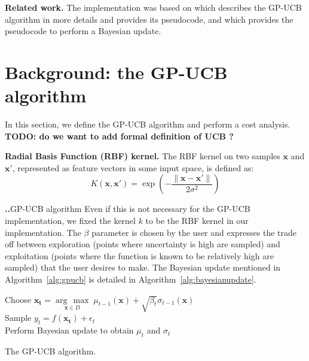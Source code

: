 \documentclass[letterpaper]{article}
\newcommand{\argmax}[1]{\underset{#1}{\operatorname{arg}\,\operatorname{max}}\;}
\newcommand{\mypar}[1]{{\bf #1.}}
\begin{document}
\mypar{Related work} The implementation was based on \cite{Krause:09} which describes the GP-UCB algorithm in more details and provides its pseudocode, and \cite{rasmussen2006gaussian} which provides the pseudocode to perform a Bayesian update.

\section{Background: the GP-UCB algorithm}\label{sec:background}

In this section, we define the GP-UCB algorithm and perform a cost analysis. \textbf{TODO: do we want to add formal definition of UCB ?}

\mypar{Radial Basis Function (RBF) kernel}
The RBF kernel on two samples $\mathbf{x}$ and $\mathbf{x'}$, represented as feature vectors in some input space, is defined as:
\begin{equation*}
    K(\mathbf{x}, \mathbf{x'}) = \exp\left(-\frac{\lVert \mathbf{x} - \mathbf{x'} \rVert}{2\sigma^2}\right)
\end{equation*}

\mypar.{GP-UCB algorithm}
Even if this is not necessary for the GP-UCB implementation, we fixed the kernel $k$ to be the RBF kernel in our implementation. The $\beta$ parameter is chosen by the user and expresses the trade off between exploration (points where uncertainty is high are sampled) and exploitation (points where the function is known to be relatively high are sampled) that the user desires to make. The Bayesian update mentioned in Algorithm~\ref{alg:gpucb} is detailed in Algorithm~\ref{alg:bayesianupdate}.
\begin{algorithm}
    \label{alg:gpucb}
        {
            Choose $\mathbf{x_t} = \argmax{\mathbf{x}\in D} \mu_{t-1}(\mathbf{x}) + \sqrt{\beta_t}\sigma_{t-1}(\mathbf{x})$\\
            Sample $y_t=f(\mathbf{x_t}) + \epsilon_t$\\
            Perform Bayesian update to obtain $\mu_t$ and $\sigma_t$
        }
    \caption{The GP-UCB algorithm. \cite{Krause:09}}
\end{algorithm}
\end{document}
